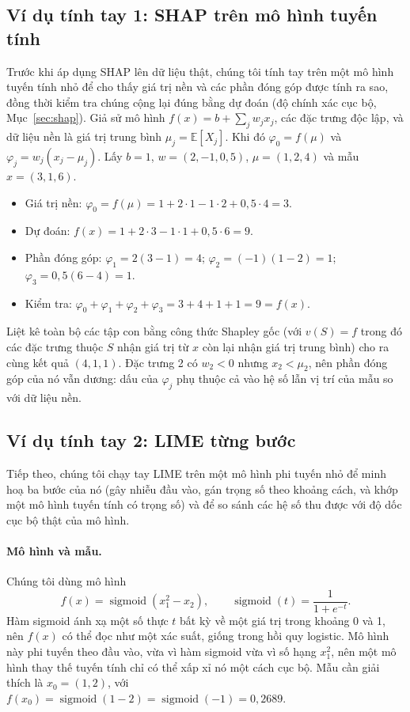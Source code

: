 \documentclass[11pt,a4paper]{article}
\begin{document}
\subsection{Ví dụ tính tay 1: SHAP trên mô hình tuyến tính}\label{sec:shaphand}
Trước khi áp dụng SHAP lên dữ liệu thật, chúng tôi tính tay trên một mô hình
tuyến tính nhỏ để cho thấy giá trị nền và các phần đóng góp được tính ra sao,
đồng thời kiểm tra chúng cộng lại đúng bằng dự đoán (độ chính xác cục bộ,
Mục~\ref{sec:shap}).
Giả sử mô hình $f(x) = b + \sum_j w_j x_j$, các đặc trưng độc lập, và dữ liệu
nền là giá trị trung bình $\mu_j = \mathbb{E}[X_j]$. Khi đó $\varphi_0 = f(\mu)$
và $\varphi_j = w_j (x_j - \mu_j)$. Lấy $b = 1$, $w = (2, -1, 0{,}5)$,
$\mu = (1, 2, 4)$ và mẫu $x = (3, 1, 6)$.
\begin{itemize}
  \item Giá trị nền: $\varphi_0 = f(\mu) = 1 + 2\cdot 1 - 1\cdot 2 + 0{,}5\cdot 4 = 3$.
  \item Dự đoán: $f(x) = 1 + 2\cdot 3 - 1\cdot 1 + 0{,}5\cdot 6 = 9$.
  \item Phần đóng góp: $\varphi_1 = 2(3 - 1) = 4$; $\varphi_2 = (-1)(1 - 2) = 1$; $\varphi_3 = 0{,}5(6 - 4) = 1$.
  \item Kiểm tra: $\varphi_0 + \varphi_1 + \varphi_2 + \varphi_3 = 3 + 4 + 1 + 1 = 9 = f(x)$.
\end{itemize}
Liệt kê toàn bộ các tập con bằng công thức Shapley gốc (với $v(S) = f$ trong
đó các đặc trưng thuộc $S$ nhận giá trị từ $x$ còn lại nhận giá trị trung
bình) cho ra cùng kết quả $(4, 1, 1)$. Đặc trưng 2 có $w_2 < 0$ nhưng
$x_2 < \mu_2$, nên phần đóng góp của nó vẫn dương: dấu của $\varphi_j$ phụ
thuộc cả vào hệ số lẫn vị trí của mẫu so với dữ liệu nền.

\subsection{Ví dụ tính tay 2: LIME từng bước}\label{sec:limehand}
Tiếp theo, chúng tôi chạy tay LIME trên một mô hình phi tuyến nhỏ để minh hoạ
ba bước của nó (gây nhiễu đầu vào, gán trọng số theo khoảng cách, và khớp một
mô hình tuyến tính có trọng số) và để so sánh các hệ số thu được với độ dốc
cục bộ thật của mô hình.

\paragraph{Mô hình và mẫu.} Chúng tôi dùng mô hình
\begin{equation}
f(x) = \operatorname{sigmoid}(x_1^2 - x_2), \qquad
\operatorname{sigmoid}(t) = \frac{1}{1 + e^{-t}}.
\end{equation}
Hàm sigmoid ánh xạ một số thực $t$ bất kỳ về một giá trị trong khoảng 0 và 1,
nên $f(x)$ có thể đọc như một xác suất, giống trong hồi quy logistic. Mô hình
này phi tuyến theo đầu vào, vừa vì hàm sigmoid vừa vì số hạng $x_1^2$, nên
một mô hình thay thế tuyến tính chỉ có thể xấp xỉ nó một cách cục bộ. Mẫu cần
giải thích là $x_0 = (1, 2)$, với
$f(x_0) = \operatorname{sigmoid}(1 - 2) = \operatorname{sigmoid}(-1) = 0{,}2689$.
\end{document}
